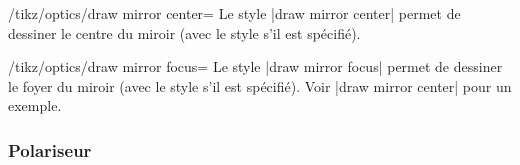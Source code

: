 \documentclass[a4paper]{ltxdoc}
\begin{document}
\begin{stylekey}{/tikz/optics/draw mirror center=}
    Le style |draw mirror center| permet de dessiner le centre du miroir (avec le style  s'il est spécifié).

\begin{codeexample}[width=5cm]
\end{codeexample}
\end{stylekey}

\begin{stylekey}{/tikz/optics/draw mirror focus=}
    Le style |draw mirror focus| permet de dessiner le foyer du miroir (avec le style  s'il est spécifié). Voir |draw mirror center| pour un exemple.
\end{stylekey}

\subsubsection{Polariseur}
\end{document}
